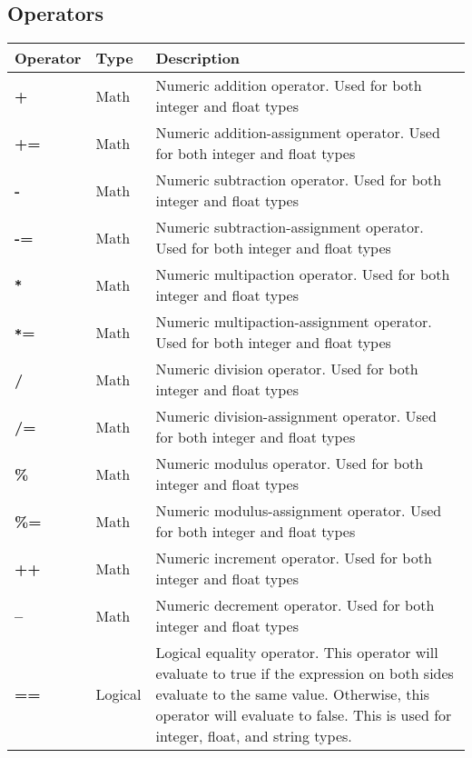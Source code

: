 \documentclass[hidelinks]{article}
\begin{document}
\subsection{Operators}
\begin{longtable}{ |p{4cm}|p{3cm}|p{8cm}|  }
\hline
\textbf{Operator} & \textbf{Type} & \textbf{Description} \\
\hline
\textbf{+}                         & Math    & Numeric addition operator. Used for both integer and float types                   \\
\textbf{+=}                        & Math    & Numeric addition-assignment operator. Used for both integer and float types \\
\textbf{-}                         & Math    & Numeric subtraction operator. Used for both integer and float types                   \\
\textbf{-=}                        & Math    & Numeric subtraction-assignment operator. Used for both integer and float types \\
\textbf{\texttt{*}}                & Math    & Numeric multipaction operator. Used for both integer and float types                   \\
\textbf{\texttt{*}=}               & Math    & Numeric multipaction-assignment operator. Used for both integer and float types \\
\textbf{/}                         & Math    & Numeric division operator. Used for both integer and float types                   \\
\textbf{/=}                        & Math    & Numeric division-assignment operator. Used for both integer and float types \\
\textbf{\%}                         & Math    & Numeric modulus operator. Used for both integer and float types                   \\
\textbf{\%=}                        & Math    & Numeric modulus-assignment operator. Used for both integer and float types \\
\textbf{++}                         & Math    & Numeric increment operator. Used for both integer and float types                   \\
\textbf{--}                         & Math    & Numeric decrement operator. Used for both integer and float types                   \\
\textbf{==}                        & Logical & Logical equality operator. This operator will evaluate to true if the expression on both sides evaluate to the same value. Otherwise, this operator will evaluate to false. This is used for integer, float, and string types.                 \\

\end{longtable}
\end{document}
